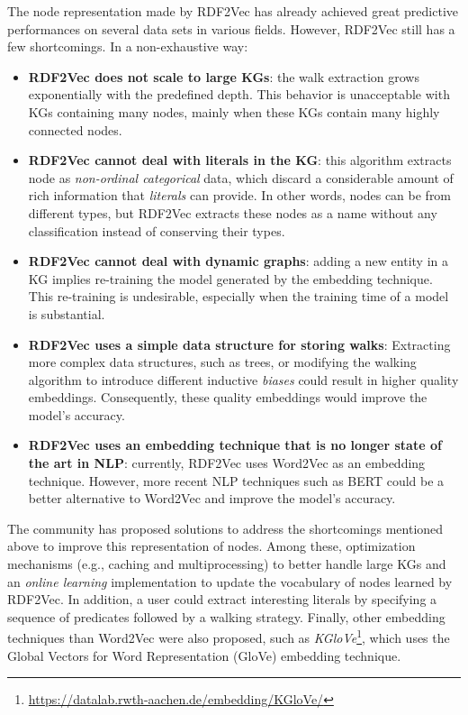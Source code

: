The node representation made by RDF2Vec has already achieved great predictive
performances on several data sets in various fields. However, RDF2Vec still has
a few shortcomings. In a non-exhaustive way:
\begin{itemize}
\item \textbf{RDF2Vec does not scale to large KGs}: the walk extraction grows
exponentially with the predefined depth. This behavior is unacceptable with KGs
containing many nodes, mainly when these KGs contain many highly connected
nodes.

\item \textbf{RDF2Vec cannot deal with literals in the KG}: this algorithm
extracts node as \emph{non-ordinal categorical} data, which discard a
considerable amount of rich information that \emph{literals} can provide. In
other words, nodes can be from different types, but RDF2Vec extracts these nodes
as a name without any classification instead of conserving their types.

\item \textbf{RDF2Vec cannot deal with dynamic graphs}: adding a new entity in a
KG implies re-training the model generated by the embedding technique. This
re-training is undesirable, especially when the training time of a model is
substantial.

\item \textbf{RDF2Vec uses a simple data structure for storing walks}:
Extracting more complex data structures, such as trees, or modifying the walking
algorithm to introduce different inductive \emph{biases} could result in higher
quality embeddings. Consequently, these quality embeddings would improve the
model's accuracy.

\item \textbf{RDF2Vec uses an embedding technique that is no longer state of the
art in NLP}: currently, RDF2Vec uses Word2Vec as an embedding
technique. However, more recent NLP techniques such as BERT could be a better
alternative to Word2Vec and improve the model's accuracy.
\end{itemize}

The community has proposed solutions to address the shortcomings mentioned above
to improve this representation of nodes. Among these, optimization mechanisms
(e.g., caching and multiprocessing) to better handle large KGs and an
\emph{online learning} implementation to update the vocabulary of nodes learned
by RDF2Vec. In addition, a user could extract interesting literals by specifying
a sequence of predicates followed by a walking strategy. Finally, other
embedding techniques than Word2Vec were also proposed, such as
\emph{KGloVe}\footnote{\url{https://datalab.rwth-aachen.de/embedding/KGloVe/}},
which uses the Global Vectors for Word Representation (GloVe) embedding
technique.

